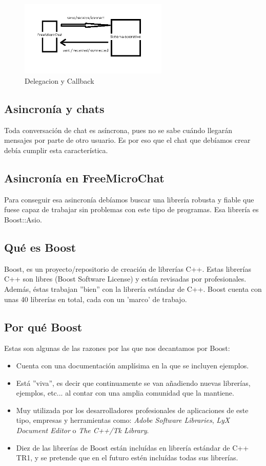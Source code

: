 \documentclass[a4paper,11pt,titlepage,halfparskip,cleardoubleempty]{scrbook}
\begin{document}
  \begin{figure} [h]
  \centering
  \includegraphics[width=200pt]{img/Callbacks-funct.png}
  \caption{Delegacion y Callback}
  \end{figure}

\subsection{Asincronía y chats}

Toda conversación de chat es asíncrona, pues no se sabe cuándo llegarán mensajes por parte de otro usuario. Es por eso que el chat que debíamos crear debía cumplir esta característica.

\subsection{Asincronía en FreeMicroChat}

Para conseguir esa asincronía debíamos buscar una librería robusta y fiable que fuese capaz de trabajar sin problemas con este tipo de programas. Esa librería es Boost::Asio.


\subsection{Qué es Boost}
Boost, es un proyecto/repositorio de creación de librerías C++. Estas librerías C++ son libres (Boost Software License) y están revisadas por profesionales. Además, éstas trabajan ''bien'' con la librería estándar de C++. Boost cuenta con unas 40 librerías en total, cada con un 'marco' de trabajo.

\subsection{Por qué Boost}
Estas son algunas de las razones por las que nos decantamos por Boost:
\begin{itemize}
\item Cuenta con una documentación amplísima en la que se incluyen ejemplos.
\item Está ''viva'', es decir que continuamente se van añadiendo nuevas librerías, ejemplos, etc... al contar con una amplia comunidad que la mantiene.
\item Muy utilizada por los desarrolladores profesionales de aplicaciones de este tipo,  empresas y herramientas como: \textit{Adobe Software Libraries},   \textit{LyX Document Editor}  o  \textit{The C++/Tk Library}.
\item Diez de las librerías de Boost están incluídas en librería estándar de C++ TR1, y se pretende que en el futuro estén incluídas todas sus librerías.
\end{itemize}
\end{document}
